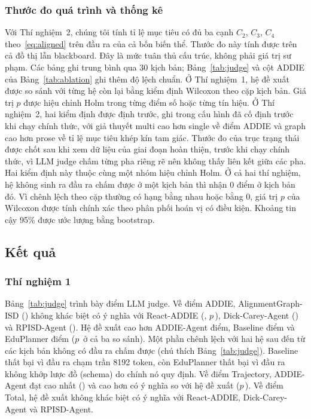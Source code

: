 \documentclass[conference,a4paper]{IEEEtran}
\begin{document}
\subsubsection{Thước đo quá trình và thống kê}
Với Thí nghiệm~2, chúng tôi tính tỉ lệ mục tiêu có đủ ba cạnh $C_2$, $C_3$, $C_4$ theo~\eqref{eq:aligned} trên đầu ra của cả bốn biến thể. Thước đo này tính được trên cả đồ thị lẫn blackboard. Đây là mức tuân thủ cấu trúc, không
phải giá trị sư phạm. Các bảng ghi trung bình qua 30 kịch bản; Bảng~\ref{tab:judge} và cột ADDIE của Bảng~\ref{tab:ablation} ghi thêm độ lệch chuẩn. Ở Thí nghiệm~1, hệ đề xuất được so sánh với từng hệ còn lại bằng kiểm định
Wilcoxon theo cặp kịch bản. Giá trị $p$ được hiệu chỉnh Holm trong từng điểm số
hoặc từng tín hiệu. Ở Thí nghiệm~2, hai kiểm định được định trước, ghi trong cấu hình đã cố định trước khi chạy chính thức, với giả thuyết multi cao hơn single về điểm ADDIE và graph cao hơn prose về tỉ lệ mục tiêu khép kín tam giác. Thước đo của trục trạng thái được chốt sau khi xem dữ liệu của giai đoạn hoàn thiện, trước khi chạy chính thức, vì LLM judge chấm từng pha riêng rẽ nên không thấy liên kết giữa các pha. Hai kiểm định này thuộc cùng một nhóm hiệu chỉnh Holm.
Ở cả hai thí nghiệm, hệ không sinh ra đầu ra chấm được ở một kịch bản thì nhận
0 điểm ở kịch bản đó. Vì chênh lệch theo cặp thường có hạng bằng nhau hoặc bằng 0, giá trị $p$ của Wilcoxon được tính chính xác theo phân phối hoán vị có điều kiện. Khoảng tin cậy 95\% được ước lượng bằng bootstrap.

\subsection{Kết quả}
\label{sec:results}







\subsubsection{Thí nghiệm 1}
Bảng~\ref{tab:judge} trình bày điểm LLM judge. Về điểm ADDIE, AlignmentGraph-ISD
(\cmpAGAddie) không khác biệt có ý nghĩa với React-ADDIE (\cmpReactAddie,
$p$\,\cmpReactAddieP), Dick-Carey-Agent (\cmpDickAddie) và RPISD-Agent
(\cmpRpisdAddie). Hệ đề xuất cao hơn ADDIE-Agent \cmpAddieAddieDiff{} điểm,
Baseline \cmpBaseAddieDiff{} điểm và EduPlanner \cmpEduAddieDiff{} điểm
($p$\,\cmpEduAddieP{} ở cả ba so sánh). Một phần chênh lệch với hai hệ sau đến từ các kịch bản không
có đầu ra chấm được (chú thích Bảng~\ref{tab:judge}). Baseline thất bại vì đầu ra chạm
trần 8192 token, còn EduPlanner thất bại vì đầu ra không khớp lược đồ (schema) do chính nó quy định. Về
điểm Trajectory, ADDIE-Agent đạt cao nhất (\cmpAddieTraj) và cao hơn có ý nghĩa so với hệ đề xuất ($p$\,\cmpAddieTrajP). Về điểm Total, hệ đề xuất không khác biệt có ý nghĩa với React-ADDIE, Dick-Carey-Agent và RPISD-Agent.
\end{document}
